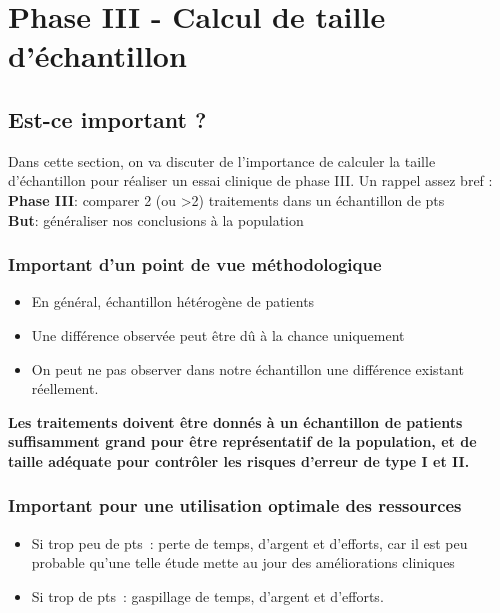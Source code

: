 \chapter{Phase III - Calcul de taille d'échantillon}

\section{Est-ce important ?}
Dans cette section, on va discuter de l'importance de calculer la taille d'échantillon pour réaliser un essai clinique de phase III.
Un rappel assez bref : \\

\textbf{Phase III}: comparer 2 (ou >2) traitements dans un échantillon de pts\\

\textbf{But}: généraliser nos conclusions à la population

\subsection{Important d’un point de vue méthodologique}
\begin{itemize}
    \item En général, échantillon hétérogène de patients
    \item Une différence observée peut être dû à la chance uniquement
    \item On peut ne pas observer dans notre échantillon une différence existant réellement.
\end{itemize}

\vspace{0.18cm}

\textbf{Les traitements doivent être donnés à un échantillon de patients suffisamment grand pour être représentatif de la population, et de taille adéquate pour contrôler les risques d’erreur de type I et II.}

\subsection{Important pour une utilisation optimale des ressources}
\begin{itemize}
    \item Si trop peu de pts : perte de temps, d’argent et d’efforts, car il est peu probable qu’une telle étude mette au jour des améliorations cliniques
    \item Si trop de pts : gaspillage de temps, d’argent et d’efforts.
\end{itemize}


